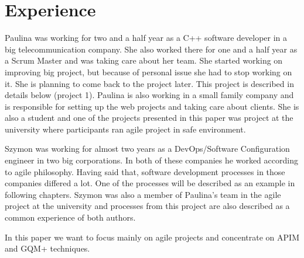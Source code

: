 \section{Experience}

Paulina was working for two and a half year as a C++ software developer in a big telecommunication company. She also worked there for one and a half year as a Scrum Master and was taking care about her team. She started working on improving big project, but because of personal issue she had to stop working on it. She is planning to come back to the project later. This project is described in details below (project 1). Paulina is also working in a small family company and is responsible for setting up the web projects and taking care about clients. She is also a student and one of the projects presented in this paper was project at the university where participants ran agile project in safe environment.

Szymon was working for almost two years as a DevOps/Software Configuration engineer in two big corporations. In both of these companies he worked according to agile philosophy. Having said that, software development processes in those companies differed a lot. One of the processes will be described as an example in following chapters. Szymon was also a member of Paulina's team in the agile project at the university and processes from this project are also described as a common experience of both authors.

In this paper we want to focus mainly on agile projects and concentrate on APIM and GQM+ techniques.
